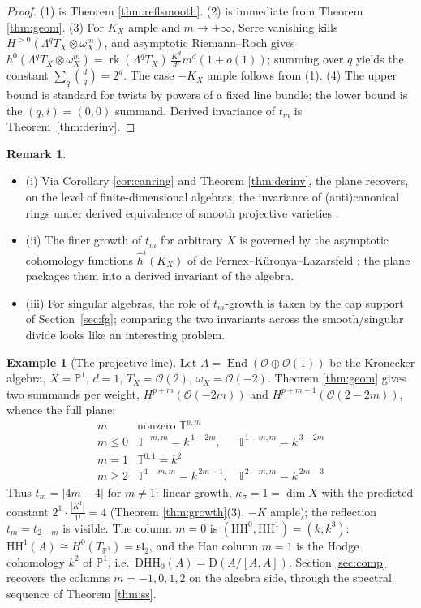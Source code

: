 \documentclass[11pt]{amsart}
\theoremstyle{definition}
\newtheorem{example}[theorem]{Example}
\newtheorem{remark}[theorem]{Remark}
\newcommand{\T}{\mathbb{T}}
\newcommand{\HH}{\mathrm{HH}}
\newcommand{\D}{\mathrm{D}}
\newcommand{\kk}{k}
\begin{document}
\begin{proof}
(1) is Theorem \ref{thm:reflsmooth}. (2) is immediate from Theorem
\ref{thm:geom}. (3) For $K_X$ ample and $m\to+\infty$, Serre vanishing kills
$H^{>0}(\Lambda^qT_X\otimes\omega_X^m)$, and asymptotic Riemann--Roch gives
$h^0(\Lambda^qT_X\otimes\omega_X^m)=\operatorname{rk}(\Lambda^qT_X)\,
\frac{K^d}{d!}m^d(1+o(1))$; summing over $q$ yields the constant
$\sum_q\binom dq=2^d$. The case $-K_X$ ample follows from (1). (4) The upper
bound is standard for twists by powers of a fixed line bundle; the lower
bound is the $(q,i)=(0,0)$ summand. Derived invariance of $t_m$ is
Theorem~\ref{thm:derinv}.
\end{proof}

\begin{remark}
\begin{itemize}
    \item (i) Via Corollary \ref{cor:canring} and Theorem \ref{thm:derinv}, the plane
recovers, on the level of finite-dimensional algebras, the invariance of
(anti)canonical rings under derived equivalence of smooth projective
varieties \cite{OrlovSurvey}.
    \item  (ii) The finer growth of $t_m$ for arbitrary
$X$ is governed by the asymptotic cohomology functions
$\widehat h^i(K_X)$ of de Fernex--K\"uronya--Lazarsfeld \cite{dFKL}; the
plane packages them into a derived invariant of the algebra.
    \item  (iii) For
singular algebras, the role of $t_m$-growth is taken by the cap support of
Section~\ref{sec:fg}; comparing the two invariants across the
smooth/singular divide looks like an interesting problem.
\end{itemize}

\end{remark}

\begin{example}[The projective line]\label{ex:P1}
Let $A=\operatorname{End}(\mathcal O\oplus\mathcal O(1))$ be the Kronecker
algebra, $X=\mathbb P^1$, $d=1$, $T_X=\mathcal O(2)$,
$\omega_X=\mathcal O(-2)$. Theorem \ref{thm:geom} gives two summands per
weight, $H^{p+m}(\mathcal O(-2m))$ and $H^{p+m-1}(\mathcal O(2-2m))$, whence
the full plane:
\[
\begin{array}{c|cc}
m & \text{nonzero }\T^{p,m} &\\
\hline
m\le0 & \T^{-m,m}=\kk^{\,1-2m}, & \T^{1-m,m}=\kk^{\,3-2m}\\
m=1 & \T^{0,1}=\kk^{2} & \\
m\ge2 & \T^{1-m,m}=\kk^{\,2m-1}, & \T^{2-m,m}=\kk^{\,2m-3}
\end{array}
\]
Thus $t_m=|4m-4|$ for $m\ne1$: linear growth, $\kappa_\sigma=1=\dim X$ with
the predicted constant $2^1\cdot\tfrac{|K^1|}{1!}=4$ (Theorem
\ref{thm:growth}(3), $-K$ ample); the reflection $t_m=t_{2-m}$ is visible.
The column $m=0$ is $(\HH^0,\HH^1)=(\kk,\kk^3)$:
$\HH^1(A)\cong H^0(T_{\mathbb P^1})=\mathfrak{sl}_2$, and the Han column
$m=1$ is the Hodge cohomology $\kk^2$ of $\mathbb P^1$, i.e.\
$\D\HH_0(A)=\D(A/[A,A])$. Section \ref{sec:comp} recovers the columns
$m=-1,0,1,2$ on the algebra side, through the
spectral sequence of Theorem \ref{thm:ss}.
\end{example}
\end{document}
